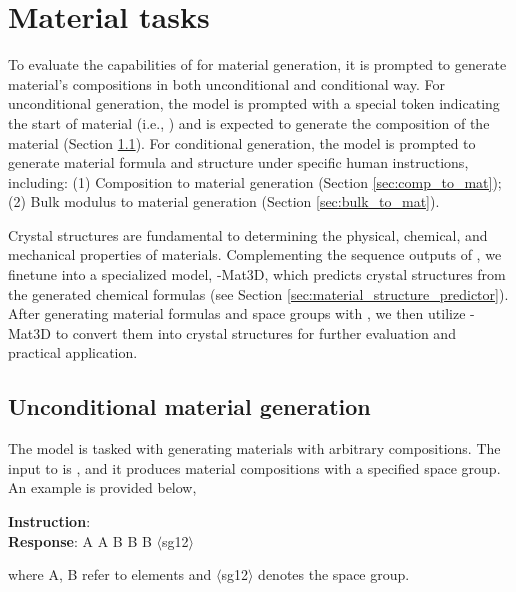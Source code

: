 \section{Material tasks}\label{sec:material}
To evaluate the capabilities of \ourM{} for material generation, it is prompted to generate material's compositions in both unconditional and conditional way. For unconditional generation, the model is prompted with a special token indicating the start of material (i.e., \material{}) and is expected to generate the composition of the material (Section \ref{sec:uncondition_mat}). For conditional generation, the model is prompted to generate material formula and structure under specific human instructions, including: (1) Composition to material generation (Section \ref{sec:comp_to_mat}); (2) Bulk modulus to material generation (Section \ref{sec:bulk_to_mat}). 

Crystal structures are fundamental to determining the physical, chemical, and mechanical properties of materials. Complementing the sequence outputs of \ourM{}, we finetune \ourM{} into a specialized model, \ourM{}-Mat3D, which predicts crystal structures from the generated chemical formulas (see Section \ref{sec:material_structure_predictor}). After generating material formulas and space groups with \ourM{}, we then utilize \ourM{}-Mat3D to convert them into crystal structures for further evaluation and practical application.





\subsection{Unconditional material generation}\label{sec:uncondition_mat}
The model is tasked with generating materials with arbitrary compositions. The input to \ourM{} is \material{}, and it produces material compositions with a specified space group. An example is provided below,
\begin{example}
\noindent\textbf{Instruction}: \material{} \\
\noindent\textbf{Response}: \material{} A A B B B $\langle$sg12$\rangle$\ematerial{}
\end{example}
where A, B refer to elements and $\langle$sg12$\rangle$ denotes the space group.

